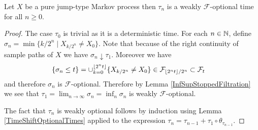 \begin{lem}Let $X$ be a pure jump-type Markov process then
$\tau_n$ is a weakly $\mathcal{F}$-optional time for all $n \geq 0$.
\end{lem}
\begin{proof}
The case $\tau_0$ is trivial as it is a deterministic time.
For each $n \in \mathbb{N}$, define $\sigma_n = \min \lbrace k/2^n \mid
X_{k/2^n} \neq X_0 \rbrace$.  Note that because of the right
continuity of sample paths of $X$ we have $\sigma_n \downarrow
\tau_1$.  Moreover we have
\begin{align*}
\lbrace \sigma_n \leq t \rbrace &= \cup_{k=0}^{\lfloor 2^n t \rfloor}
\lbrace X_{k/2^n} \neq X_0 \rbrace 
\in \mathcal{F}_{\lfloor 2^n t \rfloor/2^n} \subset \mathcal{F}_t
\end{align*}
and therefore $\sigma_n$ is $\mathcal{F}$-optional.  Therefore by
Lemma \ref{InfSupStoppedFiltration} we see that $\tau_1 = \lim_{n
  \to\infty} \sigma_n = \inf_n \sigma_n$ is weakly
$\mathcal{F}$-optional.

The fact that $\tau_{n}$ is weakly optional follows by induction using
Lemma
\ref{TimeShiftOptionalTimes} applied to the expression $\tau_n =
\tau_{n-1} + \tau_1 \circ \theta_{\tau_{n-1}}$.
\end{proof}

